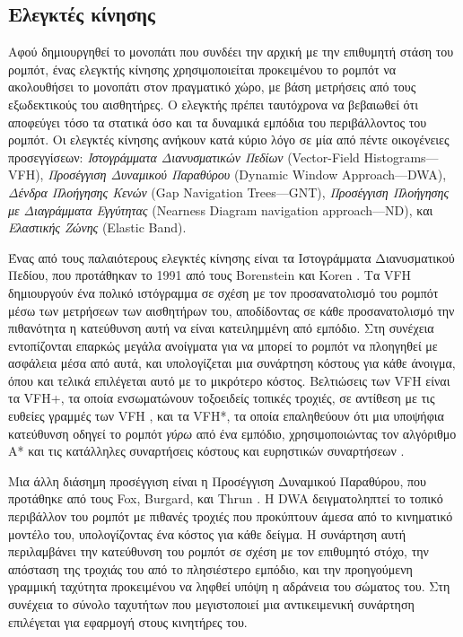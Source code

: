 \subsection{Ελεγκτές κίνησης}
\label{subsection:02_01_02:02}

Αφού δημιουργηθεί το μονοπάτι που συνδέει την αρχική με την επιθυμητή στάση του
ρομπότ, ένας ελεγκτής κίνησης χρησιμοποιείται προκειμένου το ρομπότ να
ακολουθήσει το μονοπάτι στον πραγματικό χώρο, με βάση μετρήσεις από τους
εξωδεκτικούς του αισθητήρες. Ο ελεγκτής πρέπει ταυτόχρονα να βεβαιωθεί ότι
αποφεύγει τόσο τα στατικά όσο και τα δυναμικά εμπόδια του περιβάλλοντος του
ρομπότ. Οι ελεγκτές κίνησης ανήκουν κατά κύριο λόγο σε μία από πέντε οικογένειες
προσεγγίσεων: \textit{Ιστογράμματα Διανυσματικών Πεδίων} (Vector-Field
Histograms---VFH), \textit{Προσέγγιση Δυναμικού Παραθύρου} (Dynamic Window
Approach---DWA), \textit{Δένδρα Πλοήγησης Κενών} (Gap Navigation Trees---GNT),
\textit{Προσέγγιση Πλοήγησης με Διαγράμματα Εγγύτητας} (Nearness Diagram
navigation approach---ND), και \textit{Ελαστικής Ζώνης} (Elastic Band).

Ένας από τους παλαιότερους ελεγκτές κίνησης είναι τα Ιστογράμματα Διανυσματικού
Πεδίου, που προτάθηκαν το 1991 από τους Borenstein και Koren
\cite{Borenstein1991}. Τα VFH δημιουργούν ένα πολικό ιστόγραμμα σε σχέση με τον
προσανατολισμό του ρομπότ μέσω των μετρήσεων των αισθητήρων του, αποδίδοντας σε
κάθε προσανατολισμό την πιθανότητα η κατεύθυνση αυτή να είναι κατειλημμένη από
εμπόδιο. Στη συνέχεια εντοπίζονται επαρκώς μεγάλα ανοίγματα για να μπορεί το
ρομπότ να πλοηγηθεί με ασφάλεια μέσα από αυτά, και υπολογίζεται μια συνάρτηση
κόστους για κάθε άνοιγμα, όπου και τελικά επιλέγεται αυτό με το μικρότερο
κόστος.  Βελτιώσεις των VFH είναι τα VFH+, τα οποία ενσωματώνουν τοξοειδείς
τοπικές τροχιές, σε αντίθεση με τις ευθείες γραμμές των VFH \cite{Ulrich}, και
τα VFH*, τα οποία επαληθεύουν ότι μια υποψήφια κατεύθυνση οδηγεί το ρομπότ
\textit{γύρω} από ένα εμπόδιο, χρησιμοποιώντας τον αλγόριθμο A*
\cite{russell2016artificial} και τις κατάλληλες συναρτήσεις κόστους και
ευρηστικών συναρτήσεων \cite{Ulricha}.

Μια άλλη διάσημη προσέγγιση είναι η Προσέγγιση Δυναμικού Παραθύρου, που
προτάθηκε από τους Fox, Burgard, και Thrun \cite{Fox1997}. Η DWA δειγματοληπτεί
το τοπικό περιβάλλον του ρομπότ με πιθανές τροχιές που προκύπτουν άμεσα από το
κινηματικό μοντέλο του, υπολογίζοντας ένα κόστος για κάθε δείγμα. Η συνάρτηση
αυτή περιλαμβάνει την κατεύθυνση του ρομπότ σε σχέση με τον επιθυμητό στόχο,
την απόσταση της τροχιάς του από το πλησιέστερο εμπόδιο, και την προηγούμενη
γραμμική ταχύτητα προκειμένου να ληφθεί υπόψη η αδράνεια του σώματος του. Στη
συνέχεια το σύνολο ταχυτήτων που μεγιστοποιεί μια αντικειμενική συνάρτηση
επιλέγεται για εφαρμογή στους κινητήρες του.

